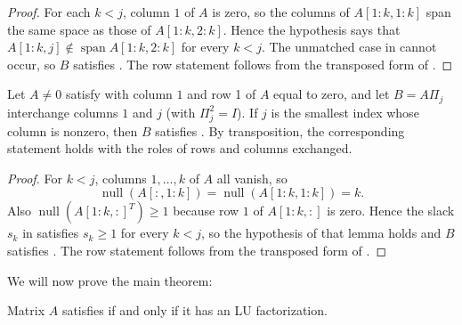 \documentclass[10pt,twoside]{siamart1116}
\DeclareMathOperator{\nl}{null}
\numberwithin{theorem}{section}
\begin{document}
\begin{proof}
  For each $k < j$, column $1$ of $A$ is zero, so the columns of $A[1:k,1:k]$ span the same space as those of $A[1:k,2:k]$. Hence the hypothesis says that $A[1:k,j] \notin \operatorname{span} A[1:k,2:k]$ for every $k < j$. The unmatched case in  cannot occur, so $B$ satisfies . The row statement follows from the transposed form of .
\end{proof}

\begin{corollary}\label{lem:zero-line-both}
  Let $A \neq 0$ satisfy  with column $1$ and row 1 of $A$ equal to zero, and let $B = A\Pi_j$ interchange columns $1$ and $j$ (with $\Pi_j^2 = I$). If $j$ is the smallest index whose column is nonzero, then $B$ satisfies . By transposition, the corresponding statement holds with the roles of rows and columns exchanged.
\end{corollary}

\begin{proof}
  For $k < j$, columns $1, \ldots, k$ of $A$ all vanish, so
  \[
    \nl(A[:,1:k]) = \nl(A[1:k,1:k]) = k.
  \]
  Also $\nl({A[1:k,:]}^T) \ge 1$ because row $1$ of $A[1:k,:]$ is zero. Hence the slack $s_k$ in  satisfies $s_k \ge 1$ for every $k < j$, so the hypothesis of that lemma holds and $B$ satisfies .
  The row statement follows from the transposed form of .
\end{proof}

We will now prove the main theorem:
\begin{theorem}\label{thm:main}
  Matrix $A$ satisfies  if and only if it has an LU factorization.
\end{theorem}
\end{document}
